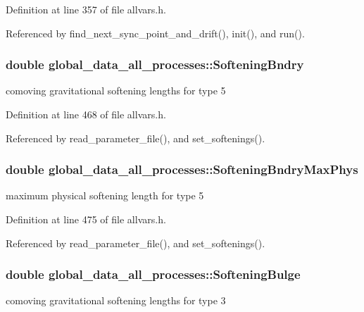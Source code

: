 Definition at line 357 of file allvars.h.



Referenced by find\_\-next\_\-sync\_\-point\_\-and\_\-drift(), init(), and run().

\hypertarget{structglobal__data__all__processes_a8c31c4a347bca34b4e8d2292f710596d}{
\subsubsection[{SofteningBndry}]{\setlength{\rightskip}{0pt plus 5cm}double {\bf global\_\-data\_\-all\_\-processes::SofteningBndry}}}
\label{structglobal__data__all__processes_a8c31c4a347bca34b4e8d2292f710596d}
comoving gravitational softening lengths for type 5 

Definition at line 468 of file allvars.h.



Referenced by read\_\-parameter\_\-file(), and set\_\-softenings().

\hypertarget{structglobal__data__all__processes_af989ac3052ad7e6bf7d7bfc824274715}{
\subsubsection[{SofteningBndryMaxPhys}]{\setlength{\rightskip}{0pt plus 5cm}double {\bf global\_\-data\_\-all\_\-processes::SofteningBndryMaxPhys}}}
\label{structglobal__data__all__processes_af989ac3052ad7e6bf7d7bfc824274715}
maximum physical softening length for type 5 

Definition at line 475 of file allvars.h.



Referenced by read\_\-parameter\_\-file(), and set\_\-softenings().

\hypertarget{structglobal__data__all__processes_a1a0c9ca2f3dfdb2371785b66ced141d7}{
\subsubsection[{SofteningBulge}]{\setlength{\rightskip}{0pt plus 5cm}double {\bf global\_\-data\_\-all\_\-processes::SofteningBulge}}}
\label{structglobal__data__all__processes_a1a0c9ca2f3dfdb2371785b66ced141d7}
comoving gravitational softening lengths for type 3 

